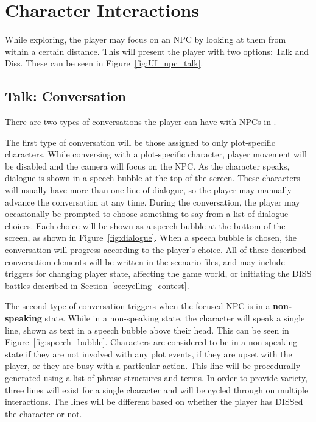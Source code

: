 \section{Character Interactions}
While exploring, the player may focus on an NPC by looking at them from within a certain distance. This will present the player with two options: Talk and Diss. These can be seen in Figure~\ref{fig:UI_npc_talk}.

\subsection{Talk: Conversation}
\label{sec:conversation}
There are two types of conversations the player can have with NPCs in \ourgame{}.

The first type of conversation will be those assigned to only plot-specific characters. While conversing with a plot-specific character, player movement will be disabled and the camera will focus on the NPC. As the character speaks, dialogue is shown in a speech bubble at the top of the screen. These characters will usually have more than one line of dialogue, so the player may manually advance the conversation at any time. During the conversation, the player may occasionally be prompted to choose something to say from a list of dialogue choices. Each choice will be shown as a speech bubble at the bottom of the screen, as shown in Figure~\ref{fig:dialogue}. When a speech bubble is chosen, the conversation will progress according to the player's choice. All of these described conversation elements will be written in the scenario files, and may include triggers for changing player state, affecting the game world, or initiating the DISS battles described in Section~\ref{sec:yelling_contest}.

The second type of conversation triggers when the focused NPC is in a \textbf{non-speaking} state. While in a non-speaking state, the character will speak a single line, shown as text in a speech bubble above their head. This can be seen in Figure~\ref{fig:speech_bubble}. Characters are considered to be in a non-speaking state if they are not involved with any plot events, if they are upset with the player, or they are busy with a particular action. This line will be procedurally generated using a list of phrase structures and terms. In order to provide variety, three lines will exist for a single character and will be cycled through on multiple interactions. The lines will be different based on whether the player has DISSed the character or not.

